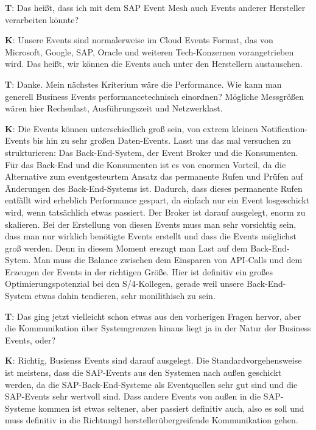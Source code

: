 \begin{list}{X:}{\setlength{\labelsep}{5mm}}
 \item[\textbf{T}:] Das hei{\ss}t, dass ich mit dem SAP Event Mesh auch Events anderer Hersteller verarbeiten könnte?
 \item[\textbf{K}:] Unsere Events sind normalerweise im Cloud Events Format, das von Microsoft, Google, SAP, Oracle und weiteren Tech-Konzernen vorangetrieben wird. Das hei{\ss}t, wir können die Events auch unter den Herstellern austauschen.
 \item[\textbf{T}:] Danke. Mein nächstes Kriterium wäre die Performance. Wie kann man generell Business Events performancetechnisch einordnen? Mögliche Messgrö{\ss}en wären hier Rechenlast, Ausführungszeit und Netzwerklast.
 \item[\textbf{K}:] Die Events können unterschiedlich gro{\ss} sein, von extrem kleinen Notification-Events bis hin zu sehr gro{\ss}en Daten-Events. Lasst uns das mal versuchen zu strukturieren: Das Back-End-System, der Event Broker und die Konsumenten. Für das Back-End und die Konsumenten ist es von enormen Vorteil, da die Alternative zum eventgesteurtem Ansatz das permanente Rufen und Prüfen auf Änderungen des Back-End-Systems ist. Dadurch, dass dieses permanente Rufen entfällt wird erheblich Performance gespart, da einfach nur ein Event losgeschickt wird, wenn tatsächlich etwas passiert. Der Broker ist darauf ausgelegt, enorm zu skalieren. Bei der Erstellung von diesen Events muss man sehr vorsichtig sein, dass man nur wirklich benötigte Events erstellt und dass die Events möglichst gro{\ss} werden. Denn in diesem Moment erezugt man Last auf dem Back-End-Sytem. Man muss die Balance zwischen dem Einsparen von API-Calls und dem Erzeugen der Events in der richtigen Grö{\ss}e. Hier ist definitiv ein gro{\ss}es Optimierungspotenzial bei den S/4-Kollegen, gerade weil unsere Back-End-System etwas dahin tendieren, sehr monilithisch zu sein.
 \item[\textbf{T}:] Das ging jetzt vielleicht schon etwas aus den vorherigen Fragen hervor, aber die Kommunikation über Systemgrenzen hinaus liegt ja in der Natur der Business Events, oder?
 \item[\textbf{K}:] Richtig, Busienss Events sind darauf ausgelegt. Die Standardvorgehensweise ist meistens, dass die SAP-Events aus den Systemen nach au{\ss}en geschickt werden, da die SAP-Back-End-Systeme als Eventquellen sehr gut sind und die SAP-Events sehr wertvoll sind. Dass andere Events von au{\ss}en in die SAP-Systeme kommen ist etwas seltener, aber passiert definitiv auch, also es soll und muss definitiv in die Richtungd herstellerübergreifende Kommunikation gehen.

\end{list}
